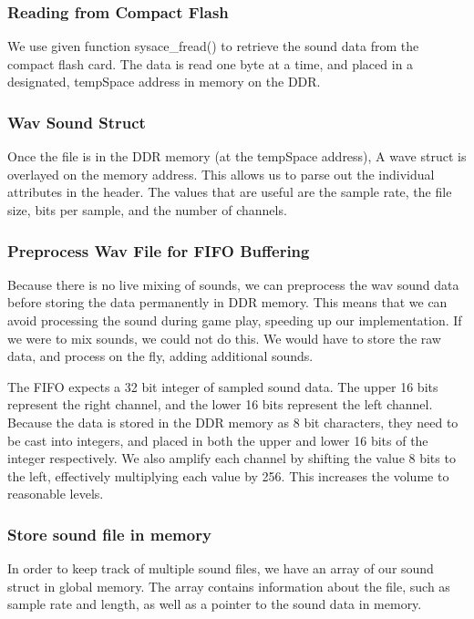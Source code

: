 \documentclass[11pt,letter,oneside]{report}
\begin{document}
\subsubsection{Reading from Compact Flash}

We use given function sysace\_fread() to retrieve the sound data from the compact flash card. The data is read one byte at a time, and placed in a designated, tempSpace address in memory on the DDR. 

\subsubsection{Wav Sound Struct}

Once the file is in the DDR memory (at the tempSpace address), A wave struct is overlayed on the memory address. This allows us to parse out the individual attributes in the header. The values that are useful are the sample rate, the file size, bits per sample, and the number of channels. 

\subsubsection{Preprocess Wav File for FIFO Buffering}

Because there is no live mixing of sounds, we can preprocess the wav sound data before storing the data permanently in DDR memory. This means that we can avoid processing the sound during game play, speeding up our implementation. If we were to mix sounds, we could not do this. We would have to store the raw data, and process on the fly, adding additional sounds. 

The FIFO expects a 32 bit integer of sampled sound data. The upper 16 bits represent the right channel, and the lower 16 bits represent the left channel. Because the data is stored in the DDR memory as 8 bit characters, they need to be cast into integers, and placed in both the upper and lower 16 bits of the integer respectively.  We also amplify each channel by shifting the value 8 bits to the left, effectively multiplying each value by 256. This increases the volume to reasonable levels.

\subsubsection{Store sound file in memory}

In order to keep track of multiple sound files, we have an array of our sound struct in global memory.  The array contains information about the file, such as sample rate and length, as well as a pointer to the sound data in memory.
\end{document}
